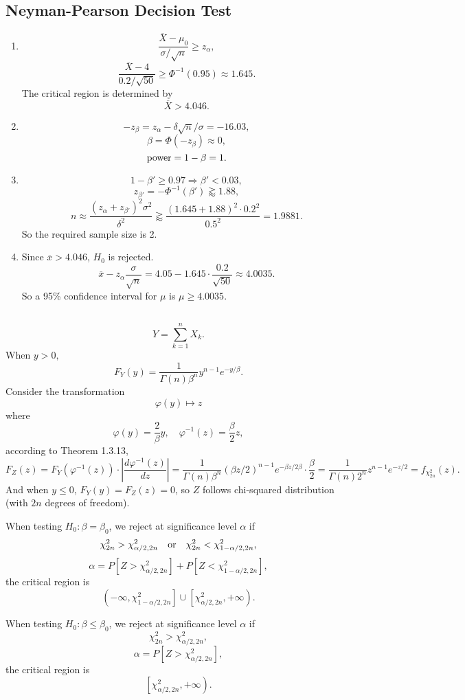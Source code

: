 \documentclass[11pt,a4paper]{article}
\begin{document}
\subsection{Neyman-Pearson Decision Test}

\begin{enumerate}[label=\roman*)]
\item
$$\frac{\overline{X}-\mu_0}{\sigma/\sqrt{n}}\geqslant z_{\alpha},$$
$$\frac{\overline{X}-4}{0.2/\sqrt{50}}\geqslant\Phi^{-1}(0.95)\approx1.645.$$
The critical region is determined by
$$\overline{X}>4.046.$$
\item
$$-z_{\beta}=z_\alpha-\delta\sqrt{n}/\sigma=-16.03,$$
$$\beta=\Phi(-z_{\beta})\approx 0,$$
$${\rm power}=1-\beta=1.$$
\item
$$1-\beta'\geqslant0.97\Longrightarrow\beta'<0.03,$$
$$z_{\beta'}=-\Phi^{-1}(\beta')\gtrapprox 1.88,$$
$$n\approx\frac{(z_\alpha+z_{\beta'})^2\sigma^2}{\delta^2}\gtrapprox\frac{(1.645+1.88)^2\cdot0.2^2}{0.5^2}=1.9881.$$
So the required sample size is 2.
\item
Since $\overline{x}>4.046$, $H_0$ is rejected.
$$\overline{x}-z_\alpha\frac{\sigma}{\sqrt{n}}=4.05-1.645\cdot\frac{0.2}{\sqrt{50}}\approx4.0035.$$
So a 95\% confidence interval for $\mu$ is $\mu\geqslant4.0035$.
\end{enumerate}

\subsection{}
$$Y=\sum_{k=1}^nX_k.$$
When $y>0,$
$$F_Y(y)=\frac{1}{\Gamma(n)\beta^n}y^{n-1}e^{-y/\beta}.$$
Consider the transformation
$$\varphi(y)\mapsto z$$ where
$$\varphi(y)=\frac{2}{\beta}y,\quad \varphi^{-1}(z)=\frac{\beta}{2}z,$$
according to Theorem 1.3.13,
$$F_Z(z)=F_Y(\varphi^{-1}(z))\cdot\left|\frac{d\varphi^{-1}(z)}{dz}\right|=\frac{1}{\Gamma(n)\beta^n}(\beta z/2)^{n-1}e^{-\beta z/2\beta}\cdot\frac{\beta}{2}=\frac{1}{\Gamma(n)2^n}z^{n-1}e^{-z/2}=f_{\chi^2_{2n}}(z).$$
And when $y\leqslant 0$, $F_Y(y)=F_Z(z)=0$, so $Z$ follows chi-squared distribution (with $2n$ degrees of freedom).

When testing $H_0:\beta=\beta_0$, we reject at significance level $\alpha$ if $$\chi^2_{2n}>\chi^2_{\alpha/2,2n}{\rm\quad or\quad}\chi^2_{2n}<\chi^2_{1-\alpha/2,2n},$$
$$\alpha=P\left[Z>\chi^2_{\alpha/2,2n}\right]+P\left[Z<\chi^2_{1-\alpha/2,2n}\right],$$
the critical region is
$$\left(-\infty,\chi^2_{1-\alpha/2,2n}\right]\cup\left[\chi^2_{\alpha/2,2n},+\infty\right).$$

When testing $H_0:\beta\leqslant\beta_0$, we reject at significance level $\alpha$ if $$\chi^2_{2n}>\chi^2_{\alpha/2,2n},$$
$$\alpha=P\left[Z>\chi^2_{\alpha/2,2n}\right],$$
the critical region is
$$\left[\chi^2_{\alpha/2,2n},+\infty\right).$$
\end{document}
